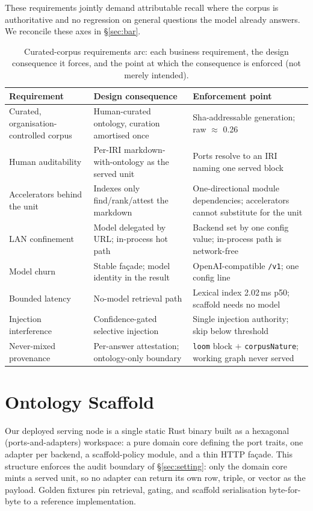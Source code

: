 \documentclass[10pt,twocolumn]{article}
\begin{document}
These requirements jointly demand attributable recall where the corpus is authoritative and no regression on general questions the model already answers. We reconcile these axes in \S\ref{sec:bar}.

\begin{table}[t]\centering\small
\caption{Curated-corpus requirements arc: each business requirement, the design consequence it
forces, and the point at which the consequence is enforced (not merely intended).}
\label{tab:req}
\renewcommand{\arraystretch}{1.15}
\begin{tabularx}{\textwidth}{@{}>{\raggedright\arraybackslash}p{3.4cm} >{\raggedright\arraybackslash}X >{\raggedright\arraybackslash}p{4.3cm}@{}}
\toprule
Requirement & Design consequence & Enforcement point \\
\midrule
Curated, organisation-controlled corpus & Human-curated ontology, curation amortised once & Sha-addressable generation; raw $\approx$ 0.26 \\
Human auditability & Per-IRI markdown-with-ontology as the served unit & Ports resolve to an IRI naming one served block \\
Accelerators behind the unit & Indexes only find/rank/attest the markdown & One-directional module dependencies; accelerators cannot substitute for the unit \\
LAN confinement & Model delegated by URL; in-process hot path & Backend set by one config value; in-process path is network-free \\
Model churn & Stable façade; model identity in the result & OpenAI-compatible \texttt{/v1}; one config line \\
Bounded latency & No-model retrieval path & Lexical index 2.02\,ms p50; scaffold needs no model \\
Injection interference & Confidence-gated selective injection & Single injection authority; skip below threshold \\
Never-mixed provenance & Per-answer attestation; ontology-only boundary & \texttt{loom} block $+$ \texttt{corpusNature}; working graph never served \\
\bottomrule
\end{tabularx}
\end{table}


\section{Ontology Scaffold}\label{sec:system}
Our deployed serving node is a single static Rust binary built as a hexagonal (ports-and-adapters) workspace: a pure domain core defining the port traits, one adapter per backend, a scaffold-policy module, and a thin HTTP façade. This structure enforces the audit boundary of \S\ref{sec:setting}: only the domain core mints a served unit, so no adapter can return its own row, triple, or vector as the payload. Golden fixtures pin retrieval, gating, and scaffold serialisation byte-for-byte to a reference implementation.
\end{document}
